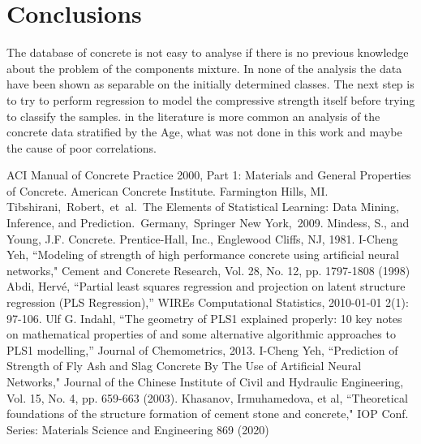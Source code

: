 \documentclass[conference]{IEEEtran}
\begin{document}








\section{Conclusions}\label{sec:conclusions}

The database of concrete is not easy to analyse if there is no previous knowledge about the problem of the components mixture. In none of the analysis the data have been shown as separable on the initially determined classes. The next step is to try to perform regression to model the compressive strength itself before trying to classify the samples. in the literature \cite{b6} is more common an analysis of the concrete data stratified by the Age, what was not done in this work and maybe the cause of poor correlations.

\begin{thebibliography}{00}
 ACI Manual of Concrete Practice 2000, Part 1: Materials and General Properties of Concrete.  American Concrete Institute.  Farmington Hills, MI.
 Tibshirani, Robert, et al. The Elements of  Statistical Learning:  Data Mining, Inference, and Prediction. Germany, Springer New York, 2009.
 Mindess, S., and Young, J.F. Concrete. Prentice-Hall, Inc., Englewood Cliffs, NJ, 1981.
 I-Cheng Yeh, ``Modeling of strength of high performance concrete using artificial neural networks," Cement and Concrete Research, Vol. 28, No. 12, pp. 1797-1808 (1998)
 Abdi, Hervé, ``Partial least squares regression and projection on latent structure regression (PLS Regression),'' WIREs Computational Statistics, 2010-01-01 2(1): 97-106.
 Ulf G. Indahl, ``The geometry of PLS1 explained properly: 10 key notes on mathematical properties of and some alternative algorithmic approaches to PLS1 modelling,'' Journal of Chemometrics, 2013.
 I-Cheng Yeh, ``Prediction of Strength of Fly Ash and Slag Concrete By The Use of Artificial Neural Networks," Journal of the Chinese Institute of Civil and Hydraulic Engineering, Vol. 15, No. 4, pp. 659-663 (2003). 
 Khasanov, Irmuhamedova, et al, ``Theoretical foundations of the structure formation of cement stone
and concrete," IOP Conf. Series: Materials Science and Engineering 869 (2020)
\end{thebibliography}
\end{document}
